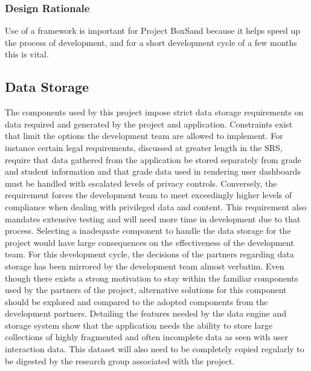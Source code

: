 \documentclass[onecolumn, draftclsnofoot,10pt, compsoc]{IEEEtran}
\begin{document}
\subsubsection{Design Rationale}
Use of a framework is important for Project BoxSand because it helps speed up the process of development, and for a short development cycle of a few months this is vital. 

\subsection{Data Storage}
The components used by this project impose strict data storage requirements on data required and generated by the project and application. Constraints exist that limit the options the development team are allowed to implement. For instance certain legal requirements, discussed at greater length in the SRS, require that data gathered from the application be stored separately from grade and student information and that grade data used in rendering user dashboards must be handled with escalated levels of privacy controls. Conversely, the requirement forces the development team to meet exceedingly higher levels of compliance when dealing with privileged data and content. This requirement also mandates extensive testing and will need more time in development due to that process. Selecting a inadequate component to handle the data storage for the project would have large consequences on the effectiveness of the development team. For this development cycle, the decisions of the partners regarding data storage has been mirrored by the development team almost verbatim. Even though there exists a strong motivation to stay within the familiar components used by the partners of the project, alternative solutions for this component should be explored and compared to the adopted components from the development partners. Detailing the features needed by the data engine and storage system show that the application needs the ability to store large collections of highly fragmented and often incomplete data as seen with user interaction data. This dataset will also need to be completely copied regularly to be digested by the research group associated with the project. 
\end{document}
